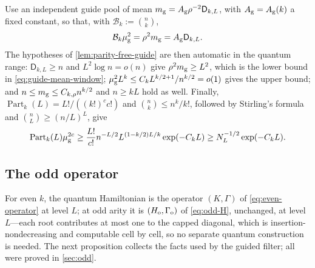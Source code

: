 \documentclass[11pt]{article}
\theoremstyle{definition}
\theoremstyle{remark}
\newcommand{\1}{\mathbf 1}
\numberwithin{equation}{section}
\begin{document}
Use an independent guide pool of mean
$m_{\rm g}=A_{\rm g}\rho^{-2}\mathsf D_{k,L}$, with
$A_{\rm g}=A_{\rm g}(k)$ a fixed constant, so that, with
$\mathcal B_k:=\binom nk$,
\begin{equation}\label{eq:guide-mu-scale}
 \mathcal B_k\mu_{\rm g}^2=\rho^2m_{\rm g}
 =A_{\rm g}\mathsf D_{k,L}.
\end{equation}
The hypotheses of \cref{lem:parity-free-guide} are then automatic in
the quantum range: $\mathsf D_{k,L}\ge n$ and $L^2\log n=o(n)$ give
$\rho^2m_{\rm g}\ge L^2$, which is the lower bound in
\cref{eq:guide-mean-window};
$\mu_{\rm g}^2L^k\le C_kL^{k/2+1}/n^{k/2}=o(1)$ gives the upper bound;
and $n\le m_{\rm g}\le C_{k,\rho}n^{k/2}$ and $n\ge kL$ hold as well.
Finally, $\operatorname{Part}_k(L)=L!/((k!)^cc!)$ and
$\binom nk\le n^k/k!$, followed by Stirling's formula and
$\binom nL\ge(n/L)^L$, give
\begin{equation}\label{eq:guide-combinatorial-overlap}
 \operatorname{Part}_k(L)\mu_{\rm g}^{2c}
 \ge \frac{L!}{c!}n^{-L/2}L^{(1-k/2)L/k}\exp(-C_kL)
 \ge N_L^{-1/2}\exp(-C_kL).
\end{equation}

\subsection{The odd operator}\label{sec:quantum-completion}

For even $k$, the quantum Hamiltonian is the operator $(K,\Gamma)$ of
\cref{eq:even-operator} at level $L$; at odd arity it is
$(H_{\rm o},\Gamma_{\rm o})$ of \cref{eq:odd-H}, unchanged, at level
$L$---each root contributes at most one to the capped diagonal, which
is insertion-nondecreasing and computable cell by cell, so no separate
quantum construction is needed.  The next proposition collects the
facts used by the guided filter; all were proved in \cref{sec:odd}.
\end{document}
